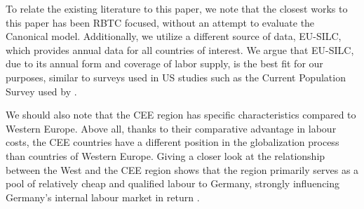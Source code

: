 \documentclass[11pt]{article}
\begin{document}
To relate the existing literature to this paper, we note that the closest works to this paper has been RBTC focused, without an attempt to evaluate the Canonical model. Additionally, we utilize a different source of data, EU-SILC, which provides annual data for all countries of interest. We argue that EU-SILC, due to its annual form and coverage of labor supply, is the best fit for our purposes, similar to surveys used in US studies such as the Current Population Survey used by \citet{katz1992changes}.

We should also note that the CEE region has specific characteristics compared to Western Europe. Above all, thanks to their comparative advantage in labour costs, the CEE countries have a different position in the globalization process than countries of Western Europe. Giving a closer look at the relationship between the West and the CEE region shows that the region primarily serves as a pool of relatively cheap and qualified labour to Germany, strongly influencing Germany's internal labour market in return 
\citep{marin2004nation, marin2018global}. 



\end{document}
